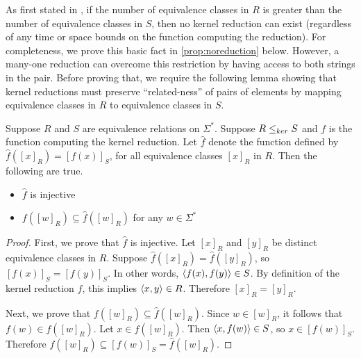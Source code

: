 As first stated in \autocite{fg11}, if the number of equivalence classes in $R$ is greater than the number of equivalence classes in $S$, then no kernel reduction can exist (regardless of any time or space bounds on the function computing the reduction).
For completeness, we prove this basic fact in \autoref{prop:noreduction} below.
However, a many-one reduction can overcome this restriction by having access to both strings in the pair.
Before proving that, we require the following lemma showing that kernel reductions must preserve ``related-ness'' of pairs of elements by mapping equivalence classes in $R$ to equivalence classes in $S$.

\begin{lemma}\label{lem:image}
  Suppose $R$ and $S$ are equivalence relations on $\Sigma^*$.
  Suppose $R \leq_{ker} S$ and $f$ is the function computing the kernel reduction.
  Let $\hat{f}$ denote the function defined by $\hat{f}([x]_R) = [f(x)]_S$, for all equivalence classes $[x]_R$ in $R$.
  Then the following are true.
  \begin{itemize}
  \item $\hat{f}$ is injective
  \item $f([w]_R) \subseteq \hat{f}([w]_R)$ for any $w \in \Sigma^*$
  \end{itemize}
\end{lemma}
\begin{proof}
  First, we prove that $\hat{f}$ is injective.
  Let $[x]_R$ and $[y]_R$ be distinct equivalence classes in $R$.
  Suppose $\hat{f}([x]_R) = \hat{f}([y]_R)$, so $[f(x)]_S = [f(y)]_S$.
  In other words, $\left\langle f(x),f(y)\right\rangle \in S$.
  By definition of the kernel reduction $f$, this implies $\left\langle x,y\right\rangle \in R$.
  Therefore $[x]_R = [y]_R$.

  Next, we prove that $f([w]_R) \subseteq \hat{f}([w]_R)$.
  Since $w \in [w]_R$, it follows that $f(w) \in f([w]_R)$.
  Let $x \in f([w]_R)$.
  Then $\left\langle x,f(w)\right\rangle \in S$, so $x \in [f(w)]_S$.
  Therefore $f([w]_R) \subseteq [f(w)]_S = \hat{f}([w]_R)$.
\end{proof}

